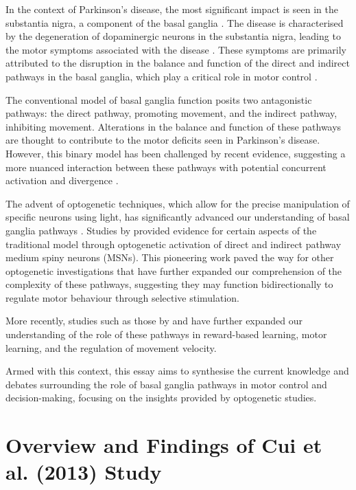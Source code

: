 \documentclass[10pt]{article}
\begin{document}
\begin{sloppypar}
  In the context of Parkinson’s disease, the most significant impact is seen in the substantia nigra, a component of the basal ganglia \citep{abedini_cooccurrence_2015}. The disease is characterised by the degeneration of dopaminergic neurons in the substantia nigra, leading to the motor symptoms associated with the disease \citep{abedini_cooccurrence_2015}. These symptoms are primarily attributed to the disruption in the balance and function of the direct and indirect pathways in the basal ganglia, which play a critical role in motor control \cite{abedini_cooccurrence_2015,ojagbemi_neuropsychiatric_2013}.


  The conventional model of basal ganglia function posits two antagonistic pathways: the direct pathway, promoting movement, and the indirect pathway, inhibiting movement. Alterations in the balance and function of these pathways are thought to contribute to the motor deficits seen in Parkinson’s disease. However, this binary model has been challenged by recent evidence, suggesting a more nuanced interaction between these pathways with potential concurrent activation and divergence \citep{dunovan_believer-skeptic_2016}.

  The advent of optogenetic techniques, which allow for the precise manipulation of specific neurons using light, has significantly advanced our understanding of basal ganglia pathways \citep{kravitz_regulation_2010, cui_concurrent_2013}. Studies by \cite{kravitz_regulation_2010} provided evidence for certain aspects of the traditional model through optogenetic activation of direct and indirect pathway medium spiny neurons (MSNs). This pioneering work paved the way for other optogenetic investigations that have further expanded our comprehension of the complexity of these pathways, suggesting they may function bidirectionally \citep{yttri_opponent_2016} to regulate motor behaviour through selective stimulation.

  More recently, studies such as those by \cite{hilt_evidence_2016} and \cite{wang_direct_2015} have further expanded our understanding of the role of these pathways in reward-based learning, motor learning, and the regulation of movement velocity.

  Armed with this context, this essay aims to synthesise the current knowledge and debates surrounding the role of basal ganglia pathways in motor control and decision-making, focusing on the insights provided by optogenetic studies.

  \section{Overview and Findings of Cui et al. (2013) Study}
  \label{sec:cui-et-al-2013}


\end{sloppypar}
\end{document}
